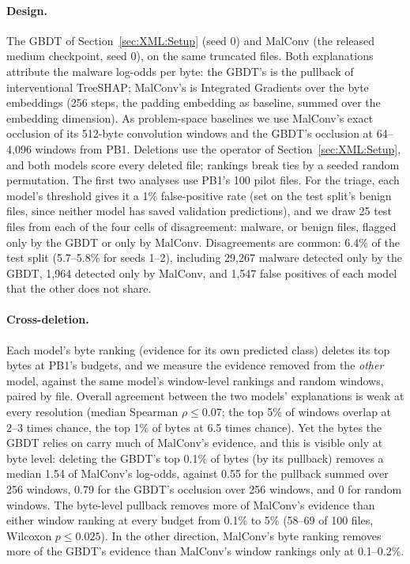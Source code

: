 \paragraph{Design.} The GBDT of Section~\ref{sec:XML:Setup} (seed 0) and MalConv (the released medium checkpoint, seed 0), on the same truncated files. Both explanations attribute the malware log-odds per byte: the GBDT's is the pullback of interventional TreeSHAP; MalConv's is Integrated Gradients over the byte embeddings (256 steps, the padding embedding as baseline, summed over the embedding dimension). As problem-space baselines we use MalConv's exact occlusion of its 512-byte convolution windows and the GBDT's occlusion at 64--4{,}096 windows from PB1. Deletions use the operator of Section~\ref{sec:XML:Setup}, and both models score every deleted file; rankings break ties by a seeded random permutation. The first two analyses use PB1's 100 pilot files. For the triage, each model's threshold gives it a 1\% false-positive rate (set on the test split's benign files, since neither model has saved validation predictions), and we draw 25 test files from each of the four cells of disagreement: malware, or benign files, flagged only by the GBDT or only by MalConv. Disagreements are common: 6.4\% of the test split (5.7--5.8\% for seeds 1--2), including 29{,}267 malware detected only by the GBDT, 1{,}964 detected only by MalConv, and 1{,}547 false positives of each model that the other does not share.

\paragraph{Cross-deletion.} Each model's byte ranking (evidence for its own predicted class) deletes its top bytes at PB1's budgets, and we measure the evidence removed from the \emph{other} model, against the same model's window-level rankings and random windows, paired by file. Overall agreement between the two models' explanations is weak at every resolution (median Spearman $\rho \leq 0.07$; the top 5\% of windows overlap at 2--3 times chance, the top 1\% of bytes at 6.5 times chance). Yet the bytes the GBDT relies on carry much of MalConv's evidence, and this is visible only at byte level: deleting the GBDT's top 0.1\% of bytes (by its pullback) removes a median 1.54 of MalConv's log-odds, against 0.55 for the pullback summed over 256 windows, 0.79 for the GBDT's occlusion over 256 windows, and 0 for random windows. The byte-level pullback removes more of MalConv's evidence than either window ranking at every budget from 0.1\% to 5\% (58--69 of 100 files, Wilcoxon $p \leq 0.025$). In the other direction, MalConv's byte ranking removes more of the GBDT's evidence than MalConv's window rankings only at 0.1--0.2\%.

